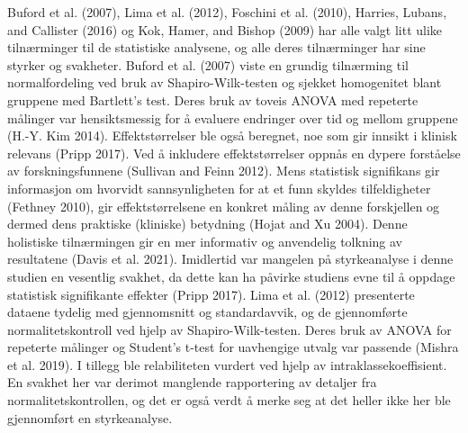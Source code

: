 \documentclass[
  letterpaper,
  DIV=11,
  numbers=noendperiod]{scrreprt}
\begin{document}
Buford et al. (2007), Lima et al. (2012), Foschini et al. (2010),
Harries, Lubans, and Callister (2016) og Kok, Hamer, and Bishop (2009)
har alle valgt litt ulike tilnærminger til de statistiske analysene, og
alle deres tilnærminger har sine styrker og svakheter. Buford et al.
(2007) viste en grundig tilnærming til normalfordeling ved bruk av
Shapiro-Wilk-testen og sjekket homogenitet blant gruppene med Bartlett's
test. Deres bruk av toveis ANOVA med repeterte målinger var
hensiktsmessig for å evaluere endringer over tid og mellom gruppene
(H.-Y. Kim 2014). Effektstørrelser ble også beregnet, noe som gir
innsikt i klinisk relevans (Pripp 2017). Ved å inkludere
effektstørrelser oppnås en dypere forståelse av forskningsfunnene
(Sullivan and Feinn 2012). Mens statistisk signifikans gir informasjon
om hvorvidt sannsynligheten for at et funn skyldes tilfeldigheter
(Fethney 2010), gir effektstørrelsene en konkret måling av denne
forskjellen og dermed dens praktiske (kliniske) betydning (Hojat and Xu
2004). Denne holistiske tilnærmingen gir en mer informativ og anvendelig
tolkning av resultatene (Davis et al. 2021). Imidlertid var mangelen på
styrkeanalyse i denne studien en vesentlig svakhet, da dette kan ha
påvirke studiens evne til å oppdage statistisk signifikante effekter
(Pripp 2017). Lima et al. (2012) presenterte dataene tydelig med
gjennomsnitt og standardavvik, og de gjennomførte normalitetskontroll
ved hjelp av Shapiro-Wilk-testen. Deres bruk av ANOVA for repeterte
målinger og Student's t-test for uavhengige utvalg var passende (Mishra
et al. 2019). I tillegg ble relabiliteten vurdert ved hjelp av
intraklassekoeffisient. En svakhet her var derimot manglende
rapportering av detaljer fra normalitetskontrollen, og det er også verdt
å merke seg at det heller ikke her ble gjennomført en styrkeanalyse.
\end{document}
